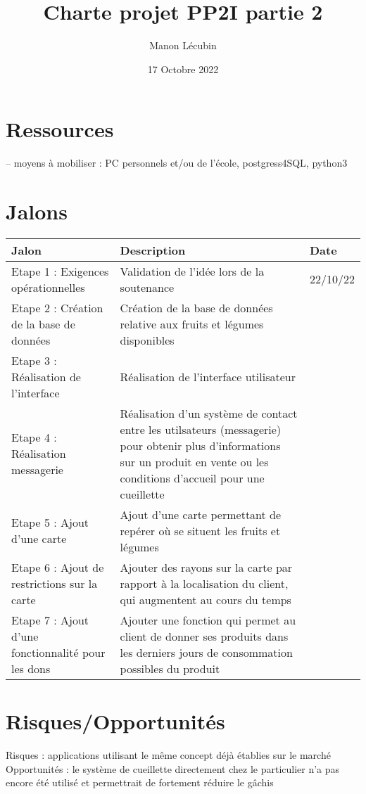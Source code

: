 \documentclass{article}
\title{Charte projet PP2I partie 2}
\author{Manon Lécubin}
\date{17 Octobre 2022}
\begin{document}
\maketitle

\section{Ressources}
-- moyens à mobiliser :
PC personnels et/ou de l'école, postgress4SQL, python3 

\section{Jalons}
\centering
\begin{tabular}{|p{3cm}|p{5cm}|p{2cm}|} 
  \hline
  Jalon & Description & Date \\
  \hline
  Etape 1 : Exigences opérationnelles & Validation de l'idée lors de la soutenance & 22/10/22 \\
  \hline
  Etape 2 : Création de la base de données & Création de la base de données relative aux fruits et légumes disponibles &  \\
  \hline
  Etape 3 : Réalisation de l'interface & Réalisation de l'interface utilisateur & \\
  \hline
  Etape 4 : Réalisation messagerie & 
  Réalisation d'un système de contact entre les utilsateurs (messagerie) pour obtenir plus d'informations sur un produit en vente ou les conditions d'accueil pour une cueillette & \\
  \hline
  Etape 5 : Ajout d'une carte & Ajout d'une carte permettant de repérer où se situent les fruits et légumes & \\
  \hline
  Etape 6 : Ajout de restrictions sur la carte & Ajouter des rayons sur la carte par rapport à la localisation du client, qui augmentent au cours du temps & \\
  \hline
  Etape 7 : Ajout d'une fonctionnalité pour les dons & Ajouter une fonction qui permet au client de donner ses produits dans les derniers jours de consommation possibles du produit & \\ 
  \hline
\end{tabular}

\section{Risques/Opportunités}
Risques : applications utilisant le même concept déjà établies sur le marché
Opportunités : le système de cueillette directement chez le particulier n'a pas encore été utilisé et permettrait de fortement réduire le gâchis
\end{document}
